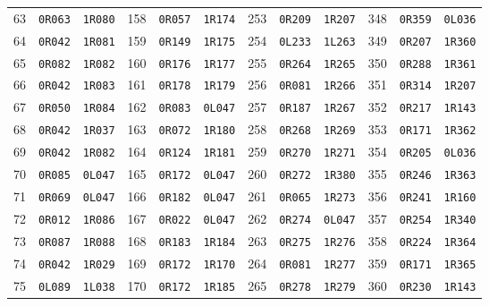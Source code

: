 \documentclass[11pt,letterpaper]{article}
\begin{document}
\begin{longtable}{@{}rll@{\qquad}rll@{\qquad}rll@{\qquad}rll@{}}
63 & \texttt{0R063} & \texttt{1R080} & 158 & \texttt{0R057} & \texttt{1R174} & 253 & \texttt{0R209} & \texttt{1R207} & 348 & \texttt{0R359} & \texttt{0L036} \\
64 & \texttt{0R042} & \texttt{1R081} & 159 & \texttt{0R149} & \texttt{1R175} & 254 & \texttt{0L233} & \texttt{1L263} & 349 & \texttt{0R207} & \texttt{1R360} \\
65 & \texttt{0R082} & \texttt{1R082} & 160 & \texttt{0R176} & \texttt{1R177} & 255 & \texttt{0R264} & \texttt{1R265} & 350 & \texttt{0R288} & \texttt{1R361} \\
66 & \texttt{0R042} & \texttt{1R083} & 161 & \texttt{0R178} & \texttt{1R179} & 256 & \texttt{0R081} & \texttt{1R266} & 351 & \texttt{0R314} & \texttt{1R207} \\
67 & \texttt{0R050} & \texttt{1R084} & 162 & \texttt{0R083} & \texttt{0L047} & 257 & \texttt{0R187} & \texttt{1R267} & 352 & \texttt{0R217} & \texttt{1R143} \\
68 & \texttt{0R042} & \texttt{1R037} & 163 & \texttt{0R072} & \texttt{1R180} & 258 & \texttt{0R268} & \texttt{1R269} & 353 & \texttt{0R171} & \texttt{1R362} \\
69 & \texttt{0R042} & \texttt{1R082} & 164 & \texttt{0R124} & \texttt{1R181} & 259 & \texttt{0R270} & \texttt{1R271} & 354 & \texttt{0R205} & \texttt{0L036} \\
70 & \texttt{0R085} & \texttt{0L047} & 165 & \texttt{0R172} & \texttt{0L047} & 260 & \texttt{0R272} & \texttt{1R380} & 355 & \texttt{0R246} & \texttt{1R363} \\
71 & \texttt{0R069} & \texttt{0L047} & 166 & \texttt{0R182} & \texttt{0L047} & 261 & \texttt{0R065} & \texttt{1R273} & 356 & \texttt{0R241} & \texttt{1R160} \\
72 & \texttt{0R012} & \texttt{1R086} & 167 & \texttt{0R022} & \texttt{0L047} & 262 & \texttt{0R274} & \texttt{0L047} & 357 & \texttt{0R254} & \texttt{1R340} \\
73 & \texttt{0R087} & \texttt{1R088} & 168 & \texttt{0R183} & \texttt{1R184} & 263 & \texttt{0R275} & \texttt{1R276} & 358 & \texttt{0R224} & \texttt{1R364} \\
74 & \texttt{0R042} & \texttt{1R029} & 169 & \texttt{0R172} & \texttt{1R170} & 264 & \texttt{0R081} & \texttt{1R277} & 359 & \texttt{0R171} & \texttt{1R365} \\
75 & \texttt{0L089} & \texttt{1L038} & 170 & \texttt{0R172} & \texttt{1R185} & 265 & \texttt{0R278} & \texttt{1R279} & 360 & \texttt{0R230} & \texttt{1R143} \\

\end{longtable}
\end{document}
